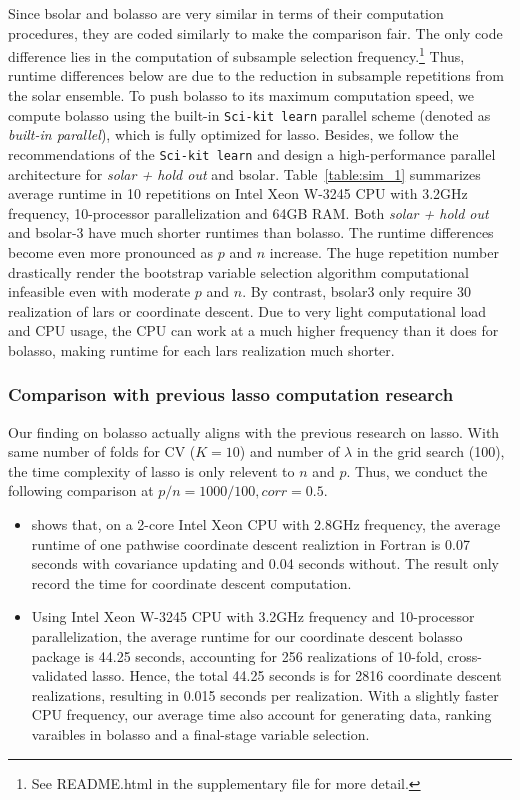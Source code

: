 \documentclass[11pt,authoryear]{elsarticle}
\begin{document}
Since bsolar and bolasso are very similar in terms of their computation procedures, they are coded similarly to make the comparison fair. The only code difference lies in the computation of subsample selection frequency.\footnote{See README.html in the supplementary file for more detail.} Thus, runtime differences below are due to the reduction in subsample repetitions from the solar ensemble. To push bolasso to its maximum computation speed, we compute bolasso using the built-in \texttt{Sci-kit learn} parallel scheme (denoted as \emph{built-in parallel}), which is fully optimized for lasso. Besides, we follow the recommendations of the \texttt{Sci-kit learn} and design a high-performance parallel architecture for \emph{solar + hold out} and bsolar. Table~\ref{table:sim_1} summarizes average runtime in 10 repetitions on Intel Xeon W-3245 CPU with 3.2GHz frequency, 10-processor parallelization and 64GB RAM. Both \emph{solar + hold out} and bsolar-3 have much shorter runtimes than bolasso. The runtime differences become even more pronounced as $p$ and $n$ increase. The huge repetition number drastically render the bootstrap variable selection algorithm computational infeasible even with moderate $p$ and $n$. By contrast, bsolar3 only require 30 realization of lars or coordinate descent. Due to very light computational load and CPU usage, the CPU can work at a much higher frequency than it does for bolasso, making runtime for each lars realization much shorter.

\subsubsection{Comparison with previous lasso computation research}

Our finding on bolasso actually aligns with the previous research on lasso. With same number of folds for CV ($K=10$) and number of $\lambda$ in the grid search (100), the time complexity of lasso is only relevent to $n$ and $p$. Thus, we conduct the following comparison at $p/n=1000/100, corr=0.5$.

\begin{itemize}
  \item \citet[Table 1]{friedman2010regularization} shows that, on a 2-core Intel Xeon CPU with 2.8GHz frequency, the average runtime of one pathwise coordinate descent realiztion in Fortran is 0.07 seconds with covariance updating and 0.04 seconds without. The \citet{friedman2010regularization} result only record the time for coordinate descent computation.
  \item Using Intel Xeon W-3245 CPU with 3.2GHz frequency and 10-processor parallelization, the average runtime for our coordinate descent bolasso package is 44.25 seconds, accounting for 256 realizations of 10-fold, cross-validated lasso. Hence, the total 44.25 seconds is for 2816 coordinate descent realizations, resulting in 0.015 seconds per realization. With a slightly faster CPU frequency, our average time also account for generating data, ranking varaibles in bolasso and a final-stage variable selection.
\end{itemize}
\end{document}
